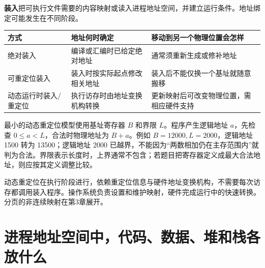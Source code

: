 \textbf{装入}把可执行文件需要的内容映射或读入进程地址空间，并建立运行条件。地址绑定可能发生在不同阶段。

\begin{wideblock}

\par\medskip\noindent\begin{minipage}{\linewidth}\fontsize{9.3}{12}\selectfont\begin{tabularx}{\linewidth}{@{}YYY@{}}
\toprule\noalign{}
\begin{minipage}[b]{\linewidth}\raggedright
方式
\end{minipage} & \begin{minipage}[b]{\linewidth}\raggedright
地址何时确定
\end{minipage} & \begin{minipage}[b]{\linewidth}\raggedright
移动到另一个物理位置会怎样
\end{minipage} \\
\midrule\noalign{}


绝对装入 & 编译或汇编时已给定绝对地址 & 通常须重新生成或修补地址 \\
可重定位装入 & 装入时按实际起点修改相关地址 & 装入后不能仅换一个基址就随意搬移 \\
动态运行时装入/重定位 & 执行访存时由地址变换机构转换 & 更新映射后可改变物理位置，需相应硬件支持 \\
\bottomrule\end{tabularx}
\end{minipage}\par\medskip

\end{wideblock}

最小的动态重定位模型使用基址寄存器 \(B\) 和界限 \(L\)。程序产生逻辑地址 \(a\)，先检查 \(0\le a<L\)，合法时物理地址为 \(B+a\)。例如 \(B=12000,L=2000\)，逻辑地址 1500 转为 13500；逻辑地址 2000 已越界，不能因为``两数相加仍在主存范围内''就判为合法。界限表示长度时，上界通常不包含；若题目把寄存器定义成最大合法地址，则应按其定义调整比较。

动态重定位在执行阶段进行，依赖重定位信息与硬件地址变换机构，不需要每次访存都调用装入程序。操作系统负责设置和维护映射，硬件完成运行中的快速转换。分页的非连续映射在第3章展开。

\section{进程地址空间中，代码、数据、堆和栈各放什么}\label{OS01-1-7}

